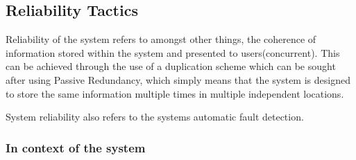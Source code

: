 \documentclass[a4paper,10pt]{article}
\begin{document}
\subsection{Reliability Tactics}
	Reliability of the system refers to amongst other things, the coherence of information stored within the system and presented to users(concurrent). This can be achieved through the use of a duplication scheme which can be sought after using Passive Redundancy, which simply means that the system is designed to store the same information multiple times in multiple independent locations. 

	System reliability also refers to the systems automatic fault detection. 

	\subsubsection{In context of the system} 
\end{document}
